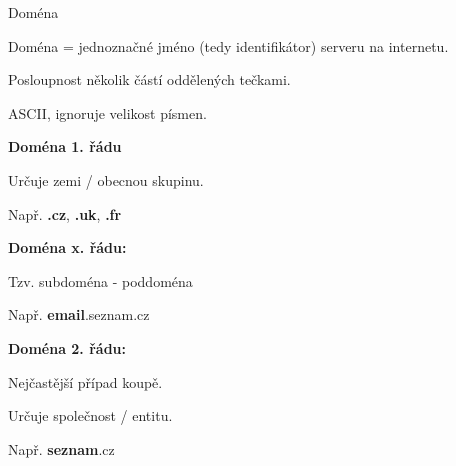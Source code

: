 \documentclass[aspectratio=1610]{beamer}
\begin{document}
\begin{frame}{Doména}
    \begin{cardTiny}
        \begin{flushleft}
        Doména = jednoznačné jméno (tedy identifikátor) serveru na internetu.

        Posloupnost několik částí oddělených tečkami.

        ASCII, ignoruje velikost písmen. 
        \end{flushleft}
    \end{cardTiny}
    
    \begin{multicols}{2}
        \centering
        
        \begin{cardTiny}
            \textbf{Doména 1. řádu}
        
            \begin{flushleft}
                Určuje zemi / obecnou skupinu.

                Např. \textbf{.cz}, \textbf{.uk}, \textbf{.fr}
            \end{flushleft}
        \end{cardTiny}

        \begin{cardTiny}
            \textbf{Doména x. řádu:}
            
            \begin{flushleft}
            Tzv. subdoména - poddoména

            Např. \textbf{email}.seznam.cz
            \end{flushleft}
        \end{cardTiny}
        
        \begin{cardTiny}
            \textbf{Doména 2. řádu:}
            
            \begin{flushleft}
            Nejčastější případ koupě.

            Určuje společnost / entitu.

            Např. \textbf{seznam}.cz
            \end{flushleft}
        \end{cardTiny}
    \end{multicols}
\end{frame}
\end{document}
